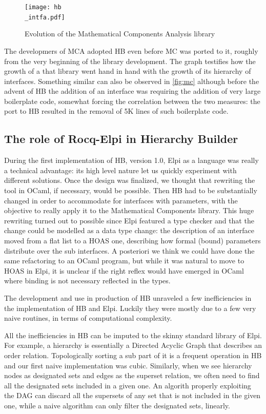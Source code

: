 \documentclass[a4paper, 11pt]{book}
\begin{document}
\begin{figure}[!hb]
\texttt{[image: hb\\\_intfa.pdf]}
\caption{Evolution of the Mathematical Components Analysis library\label{fig:mca}}
\end{figure}

The developmers of MCA adopted HB even before MC was ported to it, roughly from
the very beginning of the library development. The graph testifies how
the growth of a that library went hand in hand with the growth of
its hierarchy of interfaces. Something similar can also be observed in
\cref{fig:mc} although before the advent of HB the addition of an interface
was requiring the addition of very large boilerplate code, somewhat forcing
the correlation between the two measures: the port to HB resulted in the
removal of 5K lines of such boilerplate code.

\subsection{The role of Rocq-Elpi in Hierarchy Builder}

During the first implementation of HB, version 1.0, Elpi as a language was
really a technical advantage: its high level nature let us quickly experiment
with different solutions. Once the design was finalized, we thought that rewriting
the tool in OCaml, if necessary, would be possible. Then HB had to be substantially
changed in order to accommodate for interfaces with parameters, with the objective
to really apply it to the Mathematical Components library. This huge rewriting
turned out to possible since Elpi featured a type checker and that the change
could be modelled as a data type change: the description of an interface moved from
a flat list to a HOAS one, describing how formal (bound) parameters distribute over
the sub interfaces. A posteriori we think we could have done the same
refactoring to an OCaml program, but while it was natural to move to HOAS
in Elpi, it is unclear if the right reflex would have emerged in OCaml where
binding is not necessary reflected in the types.

The development and use in production of HB unraveled a few inefficiencies
in the implementation of HB and Elpi. Luckily they were mostly due to
a few very naive routines, in terms of computational complexity.

All the inefficiencies in HB can be imputed to the skinny standard library
of Elpi. For example, a hierarchy is essentially a Directed Acyclic Graph that
describes an order relation. Topologically sorting a sub part of it is a
frequent operation in HB and our first naive implementation was cubic.
Similarly, when we see hierarchy nodes as designated sets and
edges as the superset relation, we often need to find all the designated
sets included in a given one. An algorith properly exploiting the DAG
can discard all the supersets of any set that is not included in the given one,
while a naive algorithm can only filter the designated sets, linearly.
\end{document}
